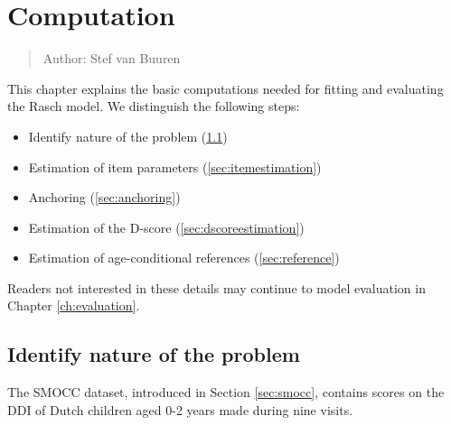\documentclass[
]{book}
\providecommand{\tightlist}{%
  \setlength{\itemsep}{0pt}\setlength{\parskip}{0pt}}
\begin{document}
\hypertarget{ch:computation}{%
\chapter{Computation}\label{ch:computation}}

\begin{quote}
Author: Stef van Buuren
\end{quote}

This chapter explains the basic computations needed for fitting and evaluating the Rasch model. We distinguish the following steps:

\begin{itemize}
\tightlist
\item
  Identify nature of the problem (\ref{sec:datapreparation})
\item
  Estimation of item parameters (\ref{sec:itemestimation})
\item
  Anchoring (\ref{sec:anchoring})
\item
  Estimation of the D-score (\ref{sec:dscoreestimation})
\item
  Estimation of age-conditional references (\ref{sec:reference})
\end{itemize}

Readers not interested in these details may continue to model evaluation in Chapter \ref{ch:evaluation}.

\hypertarget{sec:datapreparation}{%
\section{Identify nature of the problem}\label{sec:datapreparation}}

The SMOCC dataset, introduced in Section \ref{sec:smocc}, contains scores on the DDI of Dutch children aged 0-2 years made during nine visits.
\end{document}
